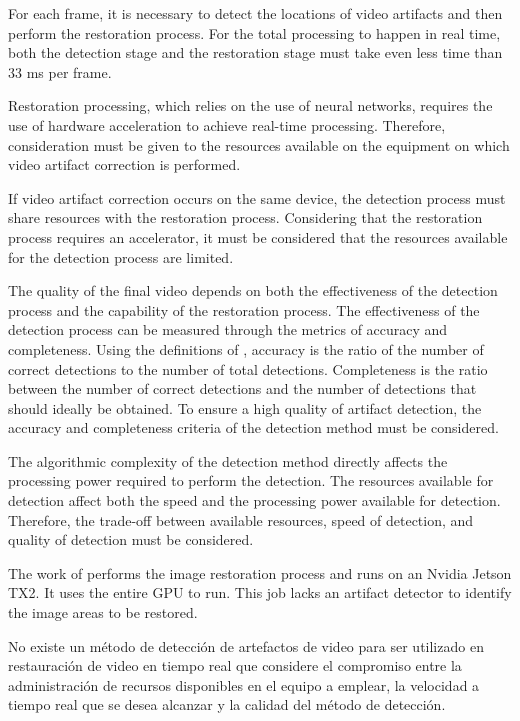 For each frame, it is necessary to detect the locations of video artifacts and then perform the restoration process. For the total processing to happen in real time, both the detection stage and the restoration stage must take even less time than 33 ms per frame.

Restoration processing, which relies on the use of neural networks, requires the use of hardware acceleration to achieve real-time processing. Therefore, consideration must be given to the resources available on the equipment on which video artifact correction is performed.

If video artifact correction occurs on the same device, the detection process must share resources with the restoration process. Considering that the restoration process requires an accelerator, it must be considered that the resources available for the detection process are limited.

The quality of the final video depends on both the effectiveness of the detection process and the capability of the restoration process. The effectiveness of the detection process can be measured through the metrics of accuracy and completeness. Using the definitions of \cite{ScikitLearn}, accuracy is the ratio of the number of correct detections to the number of total detections. Completeness is the ratio between the number of correct detections and the number of detections that should ideally be obtained. To ensure a high quality of artifact detection, the accuracy and completeness criteria of the detection method must be considered.

The algorithmic complexity of the detection method directly affects the processing power required to perform the detection. The resources available for detection affect both the speed and the processing power available for detection. Therefore, the trade-off between available resources, speed of detection, and quality of detection must be considered.

The work of \cite{Brenes2022} performs the image restoration process and runs on an Nvidia Jetson TX2. It uses the entire GPU to run. This job lacks an artifact detector to identify the image areas to be restored.

No existe un método de detección de artefactos de video para ser utilizado en restauración de video en tiempo real que considere el compromiso entre la administración de recursos disponibles en el equipo a emplear, la velocidad a tiempo real que se desea alcanzar y la calidad del método de detección.


